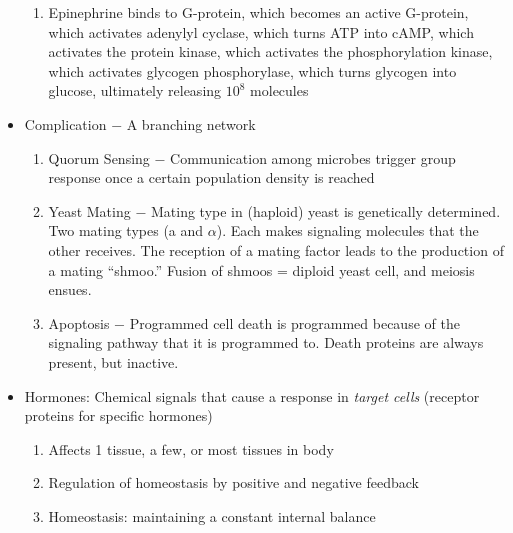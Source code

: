 \documentclass[12pt]{article}
\begin{document}
\begin{itemize}
    \begin{enumerate}

      \item Epinephrine binds to G-protein, which becomes an active G-protein, which activates adenylyl cyclase, which turns ATP into cAMP, which activates the protein kinase, which activates the phosphorylation kinase, which activates glycogen phosphorylase, which turns glycogen into glucose, ultimately releasing $10^8$ molecules

    \end{enumerate}

  \item Complication $-$ A branching network

    \begin{enumerate}

      \item Quorum Sensing $-$ Communication among microbes trigger group response once a certain population density is reached

      \item Yeast Mating $-$ Mating type in (haploid) yeast is genetically determined. Two mating types (a and $\alpha$). Each makes signaling molecules that the other receives. The reception of a mating factor leads to the production of a mating ``shmoo.'' Fusion of shmoos = diploid yeast cell, and meiosis ensues.

      \item Apoptosis $-$ Programmed cell death is programmed because of the signaling pathway that it is programmed to. Death proteins are always present, but inactive.

    \end{enumerate}

  \item Hormones: Chemical signals that cause a response in \textit{target cells} (receptor proteins for specific hormones)

    \begin{enumerate}

      \item Affects 1 tissue, a few, or most tissues in body

      \item Regulation of homeostasis by positive and negative feedback

      \item Homeostasis: maintaining a constant internal balance

    \end{enumerate}


\end{itemize}
\end{document}
